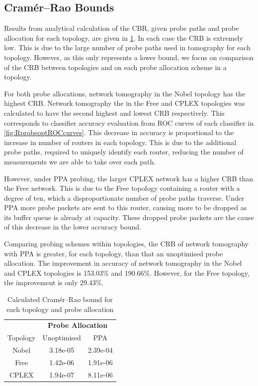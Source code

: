 \subsection{Cramér–Rao Bounds}
\label{ssec:Rloweraccuracybounds}
Results from analytical calculation of the CBR, given probe paths and probe allocation for each topology, are given in \cref{tbl:crbs}. In each case the CRB is extremely low. This is due to the large number of probe paths used in tomography for each topology. However, as this only represents a lower bound, we focus on comparison of the CRB between topologies and on each probe allocation scheme in a topology.\par
For both probe allocations, network tomography in the Nobel topology has the highest CRB. Network tomography the in the Free and CPLEX topologies was calculated to have the second highest and lowest CRB respectively. This corresponds to classifier accuracy evaluation from ROC curves of each classifier in \cref{fig:RprobeoptROCcurves}. This decrease in accuracy is proportional to the increase in number of routers in each topology. This is due to the additional probe paths, required to uniquely identify each router, reducing the number of measurements we are able to take over each path.\par
However, under PPA probing, the larger CPLEX network has a higher CRB than the Free network. This is due to the Free topology containing a router with a degree of ten, which a disproportionate number of probe paths traverse. Under PPA more probe packets are sent to this router, causing more to be dropped as its buffer queue is already at capacity. These dropped probe packets are the cause of this decrease in the lower accuracy bound.\par
Comparing probing schemes within topologies, the CRB of network tomography with PPA is greater, for each topology, than that an unoptimised probe allocation. The improvement in accuracy of network tomography in the Nobel and CPLEX topologies is 153.03\% and 190.66\%. However, for the Free topology, the improvement is only 29.43\%.\par
\begin{table}[t]
 \centering
  \begin{tabular}{@{}ccc@{}}
   \toprule
    &\multicolumn{2}{c}{\textbf{Probe Allocation}}\\
    \cmidrule(rl){2-3}
    Topology & Unoptimised & PPA \\
    \midrule
    Nobel & 3.18e-05 & 2.39e-04\\
    Free & 1.42e-06 & 1.91e-06\\
    CPLEX & 1.94e-07 & 8.11e-06\\
   \bottomrule
  \end{tabular}
  \caption{Calculated Cramér–Rao bound for each topology and probe allocation}
  \label{tbl:crbs}
\end{table}
